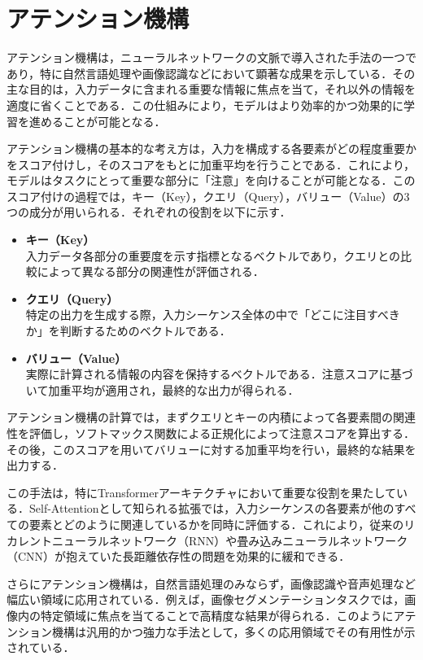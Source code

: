 
\section{アテンション機構}
アテンション機構\cite{vaswani2017attention}は，ニューラルネットワークの文脈で導入された手法の一つであり，特に自然言語処理や画像認識などにおいて顕著な成果を示している．その主な目的は，入力データに含まれる重要な情報に焦点を当て，それ以外の情報を適度に省くことである．この仕組みにより，モデルはより効率的かつ効果的に学習を進めることが可能となる．

アテンション機構の基本的な考え方は，入力を構成する各要素がどの程度重要かをスコア付けし，そのスコアをもとに加重平均を行うことである．これにより，モデルはタスクにとって重要な部分に「注意」を向けることが可能となる．このスコア付けの過程では，キー（Key），クエリ（Query），バリュー（Value）の3つの成分が用いられる．それぞれの役割を以下に示す．

\begin{itemize}
  \item \textbf{キー（Key）}\\
  入力データ各部分の重要度を示す指標となるベクトルであり，クエリとの比較によって異なる部分の関連性が評価される．
  \item \textbf{クエリ（Query）}\\
  特定の出力を生成する際，入力シーケンス全体の中で「どこに注目すべきか」を判断するためのベクトルである．
  \item \textbf{バリュー（Value）}\\
  実際に計算される情報の内容を保持するベクトルである．注意スコアに基づいて加重平均が適用され，最終的な出力が得られる．
\end{itemize}

アテンション機構の計算では，まずクエリとキーの内積によって各要素間の関連性を評価し，ソフトマックス関数による正規化によって注意スコアを算出する．その後，このスコアを用いてバリューに対する加重平均を行い，最終的な結果を出力する．

この手法は，特にTransformerアーキテクチャにおいて重要な役割を果たしている．Self-Attentionとして知られる拡張では，入力シーケンスの各要素が他のすべての要素とどのように関連しているかを同時に評価する．これにより，従来のリカレントニューラルネットワーク（RNN）や畳み込みニューラルネットワーク（CNN）\cite{fukushima1980neocognitron-cnn,lecun1989backpropagation-cnn}が抱えていた長距離依存性の問題を効果的に緩和できる．

さらにアテンション機構は，自然言語処理のみならず，画像認識や音声処理など幅広い領域に応用されている．例えば，画像セグメンテーションタスクでは，画像内の特定領域に焦点を当てることで高精度な結果が得られる．このようにアテンション機構は汎用的かつ強力な手法として，多くの応用領域でその有用性が示されている．


\newpage
